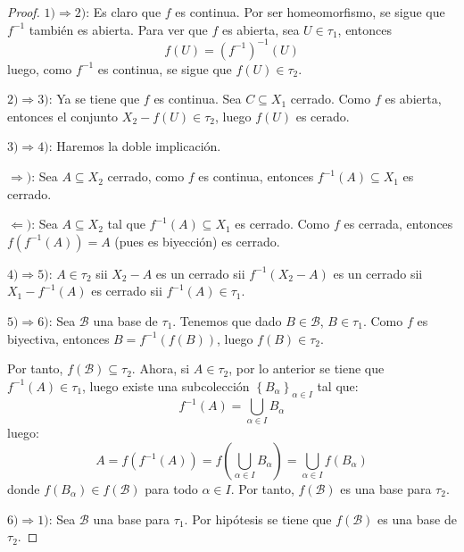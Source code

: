 \documentclass[12pt]{report}
\theoremstyle{largebreak}
\begin{document}
    \begin{proof}
        $1)\Rightarrow 2)$: Es claro que $f$ es continua. Por ser homeomorfismo, se sigue que $f^{-1}$ también es abierta. Para ver que $f$ es abierta, sea $U\in\tau_1$, entonces
        \begin{equation*}
            f(U)=(f^{-1})^{-1}(U)
        \end{equation*}
        luego, como $f^{-1}$ es continua, se sigue que $f(U)\in\tau_2$.

        $2)\Rightarrow 3)$: Ya se tiene que $f$ es continua. Sea $C\subseteq X_1$ cerrado. Como $f$ es abierta, entonces el conjunto $X_2-f(U)\in\tau_2$, luego $f(U)$ es cerado.

        $3)\Rightarrow 4)$: Haremos la doble implicación.

        $\Rightarrow)$: Sea $A\subseteq X_2$ cerrado, como $f$ es continua, entonces $f^{-1}(A)\subseteq X_1$ es cerrado.

        $\Leftarrow)$: Sea $A\subseteq X_2$ tal que $f^{-1}(A)\subseteq X_1$ es cerrado. Como $f$ es cerrada, entonces $f(f^{-1}(A))=A$ (pues es biyección) es cerrado.

        $4)\Rightarrow 5)$: $A\in\tau_2$ sii $X_2-A$ es un cerrado sii $f^{-1}(X_2-A)$ es un cerrado sii $X_1-f^{-1}(A)$ es cerrado sii $f^{-1}(A)\in\tau_1$.

        $5)\Rightarrow 6)$: Sea $\mathcal{B}$ una base de $\tau_1$. Tenemos que dado $B\in\mathcal{B}$, $B\in\tau_1$. Como $f$ es biyectiva, entonces $B=f^{-1}(f(B))$, luego $f(B)\in\tau_2$.

        Por tanto, $f(\mathcal{B})\subseteq \tau_2$. Ahora, si $A\in\tau_2$, por lo anterior se tiene que $f^{-1}(A)\in\tau_1$, luego existe una subcolección $\left\{B_\alpha \right\}_{\alpha\in I}$ tal que:
        \begin{equation*}
            f^{-1}(A)=\bigcup_{\alpha\in I}B_\alpha
        \end{equation*}
        luego:
        \begin{equation*}
            A=f(f^{-1}(A))=f\left(\bigcup_{\alpha\in I}B_\alpha\right)=\bigcup_{\alpha\in I}f(B_\alpha)
        \end{equation*}
        donde $f(B_\alpha)\in f(\mathcal{B})$ para todo $\alpha\in I$. Por tanto, $f(\mathcal{B})$ es una base para $\tau_2$.

        $6)\Rightarrow 1)$: Sea $\mathcal{B}$ una base para $\tau_1$. Por hipótesis se tiene que $f(\mathcal{B})$ es una base de $\tau_2$.


\end{proof}
\end{document}

